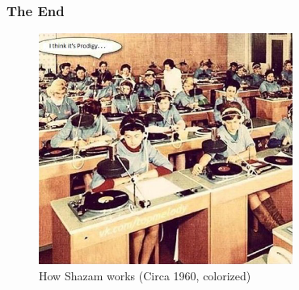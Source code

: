 \documentclass{beamer}
\begin{document}
\begin{frame}
    \frametitle{The End}
    \begin{figure}
        \centering
        \includegraphics[width=0.74\textwidth]{meme.png}
        \caption{How Shazam works (Circa 1960, colorized)}
    \end{figure}
\end{frame}
\end{document}
